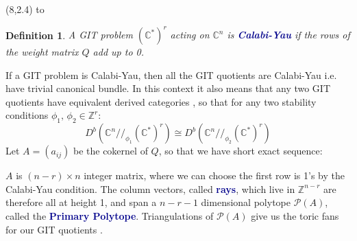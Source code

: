 \documentclass[a0]{a0poster}
\newtheorem{defn}{Definition}
\def\Head#1{\noindent\hbox to \hsize{\hfil{\LARGE\color{DarkBlue}\sf #1}}\bigskip}
\begin{document}
\begin{textblock}{7}(8,2.4)
\Head{Calabi-Yau Toric GIT}
\sf
\begin{defn}
  A GIT problem $(\mathbb{C}^*)^r$ acting on $\mathbb{C}^n$ is \textcolor{DarkBlue}{\textbf{Calabi-Yau}} if the rows of the weight matrix $Q$ add up to 0.
\end{defn}
If a GIT problem is Calabi-Yau, then all the GIT quotients are Calabi-Yau i.e. have trivial canonical bundle. In this context it also means that any two GIT quotients have equivalent derived categories \cite{derivedgit}, so that for any two stability conditions $\phi_1, \, \phi_2 \in \mathbb{Z}^r$:
$$
D^b( \mathbb{C}^n //_{\phi_1}(\mathbb{C}^*)^r) \cong D^b( \mathbb{C}^n //_{\phi_2}(\mathbb{C}^*)^r)
$$
Let $A = (a_{ij})$ be the cokernel of $Q$, so that we have short exact sequence: 
\begin{center}
\end{center}
$A$ is $ (n-r)\times n$ integer matrix, where we can choose the first row is 1's by the Calabi-Yau condition. The column vectors, called \textcolor{DarkBlue}{\textbf{rays}}, which live in $\mathbb{Z}^{n-r}$ are therefore all at height 1, and span a $n-r-1$ dimensional polytope $\mathcal{P}(A)$, called the \textcolor{DarkBlue}{\textbf{Primary Polytope}}. Triangulations of $\mathcal{P}(A)$ give us the toric fans for our GIT quotients \cite[Section 4]{coates2018crepant}.

\bigskip


\end{textblock}
\end{document}
